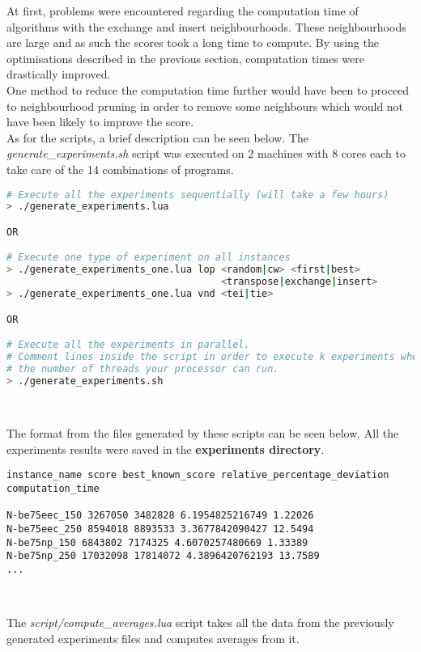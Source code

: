 At first, problems were encountered regarding the computation time of algorithms
with the exchange and insert neighbourhoods. These neighbourhoods
are large and as such the scores took a long time to compute. By using the
optimisations described in the previous section, computation times were
drastically improved.\\

One method to reduce the computation time further would have been to proceed to
neighbourhood pruning in order to remove some neighbours which would not have
been likely to improve the score.\\

\noindent As for the scripts, a brief description can be seen below. The
\emph{generate\_experiments.sh} script was executed on 2 machines with 8 cores
each to take care of the 14 combinations of programs.

\begin{lstlisting}[language=bash]
# Execute all the experiments sequentially (will take a few hours)
> ./generate_experiments.lua

OR

# Execute one type of experiment on all instances
> ./generate_experiments_one.lua lop <random|cw> <first|best>
                                     <transpose|exchange|insert>
> ./generate_experiments_one.lua vnd <tei|tie>

OR

# Execute all the experiments in parallel.
# Comment lines inside the script in order to execute k experiments where k is
# the number of threads your processor can run.
> ./generate_experiments.sh
\end{lstlisting}
\

The format from the files generated by these scripts can be seen below. All the
experiments results were saved in the \textbf{experiments directory}.

\begin{lstlisting}
instance_name score best_known_score relative_percentage_deviation computation_time

N-be75eec_150 3267050 3482828 6.1954825216749 1.22026
N-be75eec_250 8594018 8893533 3.3677842090427 12.5494
N-be75np_150 6843802 7174325 4.6070257480669 1.33389
N-be75np_250 17032098 17814072 4.3896420762193 13.7589
...
\end{lstlisting}
\

The \emph{script/compute\_averages.lua} script takes all the data from the
previously generated experiments files and computes averages from it.\\

